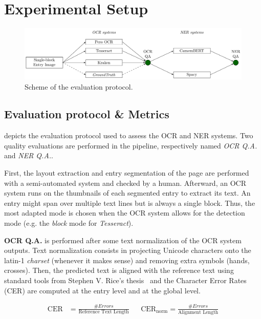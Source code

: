 \section{Experimental Setup}


\begin{figure}[tb]
\includegraphics[width=\linewidth]{figs/protocol.pdf}
\caption{Scheme of the evaluation protocol. }
\label{fig.protocol}
\end{figure}

\subsection{Evaluation protocol \& Metrics}

 depicts the evaluation protocol used to assess the OCR and NER systems. Two quality evaluations
are performed in the pipeline, respectively named \emph{OCR Q.A.} and \emph{NER Q.A.}.

First, the layout extraction and entry segmentation of the page are performed with a semi-automated system and
checked by a human. Afterward, an OCR system runs on the thumbnails of each segmented entry to extract its text. An
entry might span over multiple text lines but is always a single block. Thus, the most adapted mode is chosen when
the OCR system allows for the detection mode (e.g. the \emph{block} mode for \emph{Tesseract}). 

\textbf{OCR Q.A.} is performed after some text normalization of the OCR system outputs. Text normalization consists in
projecting Unicode characters onto the latin-1 \emph{charset} (whenever it makes sense) and removing extra symbols (hands,
crosses). Then, the predicted text is aligned with the reference text using standard tools from Stephen V. Rice's
thesis~\cite{santos.2019.wcmel,neudecker.2021.whdip} and the Character Error Rates (CER) are computed at the entry level
and at the global level. 

\begin{align}
\mathrm{CER} &=  \frac{\#Errors}{\text{Reference Text Length}} & & \mathrm{CER}_\mathrm{norm} =  \frac{\#Errors}{\text{Alignment Length}} 
\end{align}

